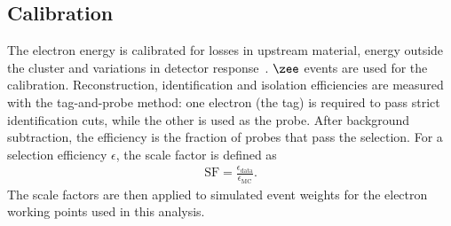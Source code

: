 \subsection{Calibration}

The electron energy is calibrated for losses in upstream material, energy outside the cluster and variations in detector response~\cite{ATLAS2019ElectronPerformance}.
$\zee$ events are used for the calibration.
Reconstruction, identification and isolation efficiencies are measured with the tag-and-probe method: one electron (the tag) is required to pass strict identification cuts, while the other is used as the probe.
After background subtraction, the efficiency is the fraction of probes that pass the selection.
For a selection efficiency $\epsilon$, the scale factor is defined as
\begin{align}
    \mathrm{SF}=\frac{\epsilon_{\mathrm{data}}}{\epsilon_{\mathrm{MC}}}.
    \label{eq:ch6_efficiency_sf}
\end{align}
The scale factors are then applied to simulated event weights for the electron working points used in this analysis.
